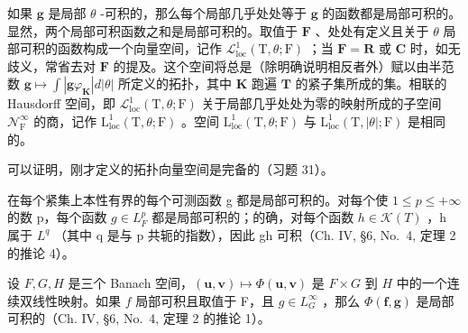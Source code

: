 如果 \(\mathbf{g}\) 是局部 \(\theta\) -可积的，那么每个局部几乎处处等于 \(\mathbf{g}\) 的函数都是局部可积的。显然，两个局部可积函数之和是局部可积的。取值于 \(\mathbf{F}\) 、处处有定义且关于 \(\theta\) 局部可积的函数构成一个向量空间，记作 \(\mathcal{L}_{\mathrm{loc}}^{1}(\mathrm{T},\theta ;\mathrm{F})\) ；当 \(\mathbf{F} = \mathbf{R}\) 或 \(\mathbf{C}\) 时，如无歧义，常省去对 \(\mathbf{F}\) 的提及。这个空间将总是（除明确说明相反者外）赋以由半范数 \(\mathbf{g}\mapsto \int |\mathbf{g}\varphi_{\mathbf{K}}|d|\theta |\) 所定义的拓扑，其中 \(\mathbf{K}\) 跑遍 \(\mathbf{T}\) 的紧子集所成的集。相联的 Hausdorff 空间，即 \(\mathcal{L}_{\mathrm{loc}}^{1}(\mathrm{T},\theta ;\mathrm{F})\) 关于局部几乎处处为零的映射所成的子空间 \(\mathcal{N}_{\mathrm{F}}^{\infty}\) 的商，记作 \(\mathrm{L}_{\mathrm{loc}}^{1}(\mathrm{T},\theta ;\mathrm{F})\) 。空间 \(\mathrm{L}_{\mathrm{loc}}^{1}(\mathrm{T},\theta ;\mathrm{F})\) 与 \(\mathrm{L}_{\mathrm{loc}}^{1}(\mathrm{T},|\theta |; \mathrm{F})\) 是相同的。

可以证明，刚才定义的拓扑向量空间是完备的（习题 31）。

在每个紧集上本性有界的每个可测函数 g 都是局部可积的。对每个使 \(1 \leqslant p \leqslant +\infty\) 的数 p，每个函数 \(g \in L_{F}^{p}\) 都是局部可积的；的确，对每个函数 \(h \in \mathcal{K}(T)\) ，h 属于 \(L^{q}\) （其中 q 是与 p 共轭的指数），因此 gh 可积（Ch. IV, §6, No.~4, 定理 2 的推论 4）。

设 \(F, G, H\) 是三个 Banach 空间，\((\mathbf{u}, \mathbf{v}) \mapsto \Phi(\mathbf{u}, \mathbf{v})\) 是 \(F \times G\) 到 \(H\) 中的一个连续双线性映射。如果 \(f\) 局部可积且取值于 F，且 \(g \in L_{G}^{\infty}\) ，那么 \(\Phi(\mathbf{f}, \mathbf{g})\) 是局部可积的（Ch. IV, §6, No.~4, 定理 2 的推论 1）。

